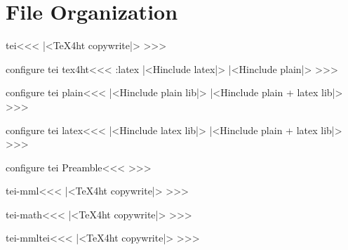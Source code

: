 %


\ifx \HTML\UnDef
   \def\HTML{tei,tei-mml,tei-mmltei,tei-math}                             
   \def\CONFIG{\jobname}
   \def\MAKETITLE{\title{Source for TEI}%
        \author{Eitan M. Gurari \& Sebastian Rahtz}}   
   \def\next{  \endinput}
   \expandafter\next
\fi




\chapter{File Organization}

\<tei\><<<
|<TeX4ht copywrite|>
>>>

\<configure tei tex4ht\><<<
\if:latex  |<Hinclude latex|>
\else      |<Hinclude plain|>  \fi
>>>

\<configure tei plain\><<<
|<Hinclude plain lib|>
|<Hinclude plain + latex lib|>
>>>

\<configure tei latex\><<<
|<Hinclude latex lib|>
|<Hinclude plain + latex lib|>
>>>

\<configure tei Preamble\><<<    
\edef\Preamble{\Preamble,refcaption}
>>>

\<tei-mml\><<<
|<TeX4ht copywrite|>
>>>


\<tei-math\><<<
|<TeX4ht copywrite|>
>>>


\<tei-mmltei\><<<
|<TeX4ht copywrite|>
>>>




